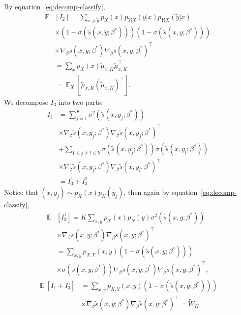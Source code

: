\documentclass[11pt,a4paper]{article}
\DeclareMathOperator{\E}{\mathbb{E}}
\newcommand{\wt}[1]{\widetilde{#1}}
\newcommand{\gbeta}{\nabla_{\beta}}
\newcommand{\px}{p_X}
\newcommand{\sbc}[3]{\wt{s}(#1, #2; #3)}
\newcommand{\wbk}{\wt{W}_{K}}
\newcommand{\mubxk}{\wt{\mu}_{x, K}}
\begin{document}
By equation~\eqref{eq:decomp-classify},
\begin{equation*}
\begin{aligned}
\E & [I_2] = \sum_{x, y, \wt{y}} p_X(x)p_{Y|X}(y|x)p_{Y|X}(\wt{y}|x) \\ 
& \times (1-\sigma(\sbc{x}{\wt{y}}{\beta^*}))(1-\sigma(\sbc{x}{y}{\beta^*})) \\
& \times \gbeta \sbc{x}{\wt{y}}{\beta^*}\gbeta\sbc{x}{y}{\beta^*}^\top\\
& = \sum_{x} p_X(x) \mubxk \mubxk^\top\\
& =  \E_X[\mubxk  (\mubxk)^\top ].
\end{aligned}
\end{equation*}
We decompose $I_3$ into two parts:
\begin{equation*}
\begin{aligned}
I_3 &= \sum_{j=1}^K \sigma^2(\wt{s}(x, y_j;\beta^*)) \\ 
& \times \gbeta \sbc{x}{y_j}{\beta^*}\gbeta \sbc{x}{y_j}{\beta^*}^\top \\
& + \sum_{1\leq j\neq l\leq k} \sigma(\sbc{x}{y_j}{\beta^*}) \sigma(\sbc{x}{y_l}{\beta^*})\\
& \times \gbeta \sbc{x}{y_j}{\beta^*}\gbeta \sbc{x}{y_l}{\beta^*}^\top\\
& = I_3^1 + I_3^2
\end{aligned}
\end{equation*}
Notice that $(x, y_j)\sim \px(x)p_N(y_j)$, then again by equation~\eqref{eq:decomp-classify},
\begin{equation*}
\begin{aligned}
\E & [I_3^1] = K \sum_{x,y}\px(x)p_N(y) \sigma^2(\sbc{x}{y}{\beta^*}) \\ 
& \times \gbeta\sbc{x}{y}{\beta^*}\gbeta\sbc{x}{y}{\beta^*}^\top\\
& = \sum_{x,y} p_{X, Y}(x, y) (1-\sigma(\sbc{x}{y}{\beta^*})) \\
& \times \sigma(\sbc{x}{y}{\beta^*})\gbeta\sbc{x}{y}{\beta^*}\gbeta\sbc{x}{y}{\beta^*}^\top,
\end{aligned}
\end{equation*}
\begin{equation*}
\begin{aligned}
\E[I_1 + I_3^1] &= \sum_{x,y} p_{X, Y}(x, y)(1-\sigma(\sbc{x}{y}{\beta^*})) \\
& \times \gbeta\sbc{x}{y}{\beta^*}\gbeta\sbc{x}{y}{\beta^*}^\top= \wbk
\end{aligned}
\end{equation*}
\end{document}
